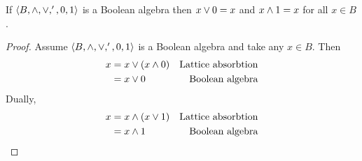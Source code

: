 \begin{theorem*}
If $\langle B, \wedge, \vee, ', 0 , 1\rangle$ is a Boolean algebra then $x \vee 0 = x$ and $x \wedge 1 = x$ for all $x\in B$.
\end{theorem*}

\begin{proof}
Assume  $\langle B, \wedge, \vee, ', 0 , 1\rangle$ is a Boolean algebra and take any $x \in B$.
Then
\begin{align*}
  x &= x \vee (x \wedge 0)           & \text{Lattice absorbtion}\\
    &= x \vee 0                     & \text{Boolean algebra}
\end{align*}
Dually,
\begin{align*}
  x &= x \wedge (x \vee 1)           & \text{Lattice absorbtion}\\
    &= x \wedge 1                     & \text{Boolean algebra}
\end{align*}
\end{proof}

